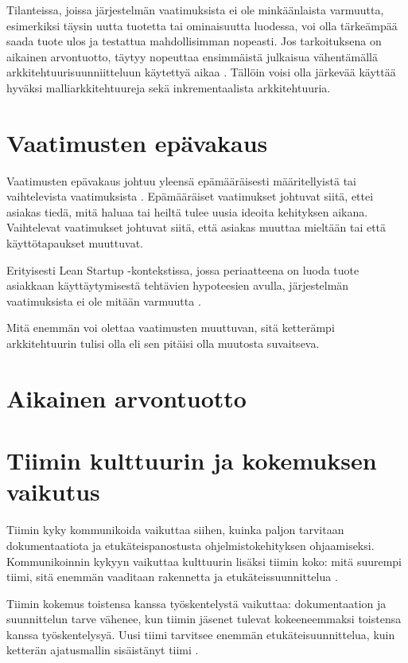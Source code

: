 Tilanteissa, joissa järjestelmän vaatimuksista ei ole minkäänlaista varmuutta, esimerkiksi täysin uutta tuotetta tai ominaisuutta luodessa, voi olla tärkeämpää saada tuote ulos ja testattua mahdollisimman nopeasti. Jos tarkoituksena on aikainen arvontuotto, täytyy nopeuttaa ensimmäistä julkaisua vähentämällä arkkitehtuurisuunniitteluun käytettyä aikaa \citep{waterman_how_2015}. Tällöin voisi olla järkevää käyttää hyväksi malliarkkitehtuureja sekä inkrementaalista arkkitehtuuria.

\section{Vaatimusten epävakaus}
Vaatimusten epävakaus johtuu yleensä epämääräisesti määritellyistä tai vaihtelevista vaatimuksista \citep{waterman_how_2015}. Epämääräiset vaatimukset johtuvat siitä, ettei asiakas tiedä, mitä haluaa tai heiltä tulee uusia ideoita kehityksen aikana. Vaihtelevat vaatimukset johtuvat siitä, että asiakas muuttaa mieltään tai että käyttötapaukset muuttuvat.

Erityisesti Lean Startup -kontekstissa, jossa periaatteena on luoda tuote asiakkaan käyttäytymisestä tehtävien hypoteesien avulla, järjestelmän vaatimuksista ei ole mitään varmuutta . \citep{reis2011lean}

Mitä enemmän voi olettaa vaatimusten muuttuvan, sitä ketterämpi arkkitehtuurin tulisi olla eli sen pitäisi olla muutosta suvaitseva.

\section{Aikainen arvontuotto}

\section{Tiimin kulttuurin ja kokemuksen vaikutus}
Tiimin kyky kommunikoida vaikuttaa siihen, kuinka paljon tarvitaan dokumentaatiota ja etukäteispanostusta ohjelmistokehityksen ohjaamiseksi. Kommunikoinnin kykyyn vaikuttaa kulttuurin lisäksi tiimin koko: mitä suurempi tiimi, sitä enemmän vaaditaan rakennetta ja etukäteissuunnittelua \citep{waterman_how_2015}.

Tiimin kokemus toistensa kanssa työskentelystä vaikuttaa: dokumentaation ja suunnittelun tarve vähenee, kun tiimin jäsenet tulevat kokeeneemmaksi toistensa kanssa työskentelysyä. Uusi tiimi tarvitsee enemmän etukäteisuunnittelua, kuin ketterän ajatusmallin sisäistänyt tiimi \citep{waterman_how_2015}.

